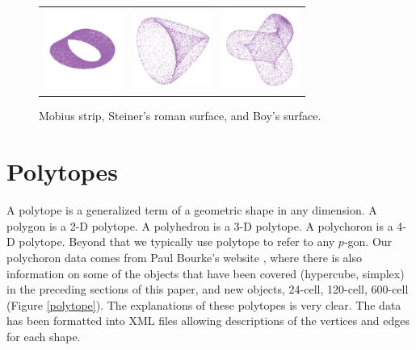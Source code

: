 \begin{figure}[ht]
\centering
\begin{tabular}{ccc}
\includegraphics[width=1in]{fig/mobius.pdf}&\includegraphics[width=1in]{fig/roman.pdf}&\includegraphics[width=1in]{fig/boy-surface.pdf}
\end{tabular}
\caption{Mobius strip, Steiner's roman surface, and Boy's surface.}
\label{klein}
\end{figure}

\section{Polytopes}

A polytope is a generalized term of a geometric shape in any
dimension. A polygon is a 2-D polytope. A polyhedron is a 3-D
polytope. A polychoron is a 4-D polytope. Beyond that we typically use
polytope to refer to any $p$-gon.  Our polychoron data comes from Paul
Bourke's website \citep{PBPlatonic}, where there is also information on some of the
objects that have been covered (hypercube, simplex) in the preceding sections of this paper, and new
objects, 24-cell, 120-cell, 600-cell (Figure \ref{polytope}).  The explanations of these
polytopes is very clear. The data has been formatted into XML files
allowing descriptions of the vertices and edges for each shape.

